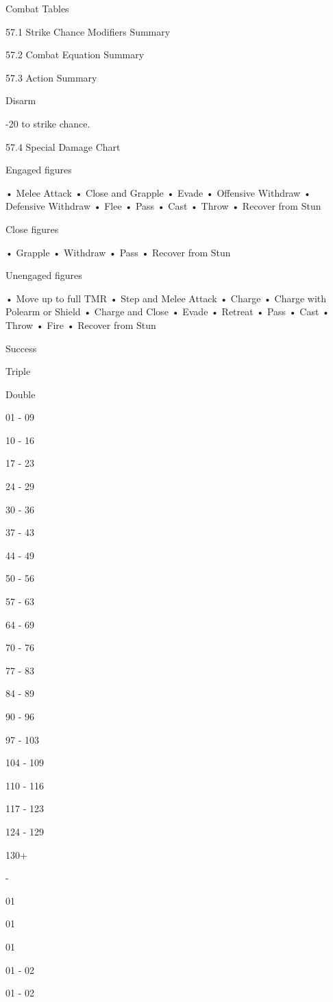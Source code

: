 \begin{Table}{Combat Tables}

57.1 Strike Chance Modifiers Summary 

57.2 Combat Equation Summary 

57.3 Action Summary 

Disarm  

-20 to strike chance. 

57.4 Special Damage Chart 

Engaged figures  

• Melee Attack  
• Close and Grapple  
• Evade  
• Offensive Withdraw  
• Defensive Withdraw  
• Flee  
• Pass  
• Cast  
• Throw  
• Recover from Stun 

Close figures  

• Grapple  
• Withdraw  
• Pass  
• Recover from Stun 

Unengaged figures  

• Move up to full TMR  
• Step and Melee Attack  
• Charge  
• Charge with Polearm or Shield  
• Charge and Close  
• Evade  
• Retreat  
• Pass  
• Cast  
• Throw  
• Fire  
• Recover from Stun 
 

Success 

Triple 

Double 

01 - 09 

10 - 16 

17 - 23 

24 - 29 

30 - 36 

37 - 43 

44 - 49 

50 - 56 

57 - 63 

64 - 69 

70 - 76 

77 - 83 

84 - 89 

90 - 96 

97 - 103 

104 - 109 

110 - 116 

117 - 123 

124 - 129 

130+ 

- 

01 

01 

01 

01 - 02 

01 - 02 


\end{Table}
